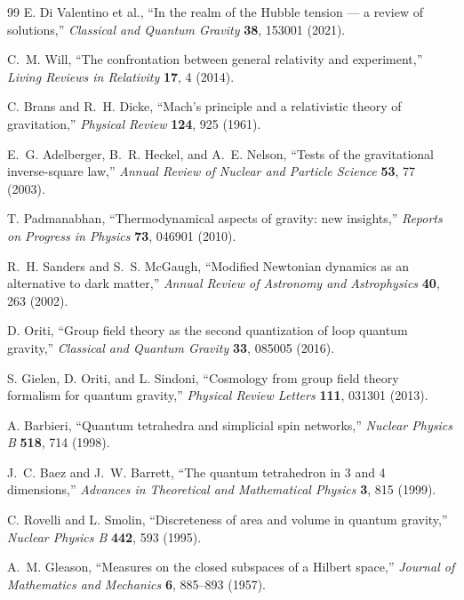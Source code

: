\documentclass[11pt]{article}
\begin{document}
\begin{thebibliography}{99}
E. Di Valentino et al.,
``In the realm of the Hubble tension --- a review of solutions,''
\emph{Classical and Quantum Gravity} \textbf{38}, 153001 (2021).

C.~M. Will,
``The confrontation between general relativity and experiment,''
\emph{Living Reviews in Relativity} \textbf{17}, 4 (2014).

C. Brans and R.~H. Dicke,
``Mach's principle and a relativistic theory of gravitation,''
\emph{Physical Review} \textbf{124}, 925 (1961).

E.~G. Adelberger, B.~R. Heckel, and A.~E. Nelson,
``Tests of the gravitational inverse-square law,''
\emph{Annual Review of Nuclear and Particle Science} \textbf{53}, 77 (2003).

T. Padmanabhan,
``Thermodynamical aspects of gravity: new insights,''
\emph{Reports on Progress in Physics} \textbf{73}, 046901 (2010).

R.~H. Sanders and S.~S. McGaugh,
``Modified Newtonian dynamics as an alternative to dark matter,''
\emph{Annual Review of Astronomy and Astrophysics} \textbf{40}, 263 (2002).

D. Oriti,
``Group field theory as the second quantization of loop quantum gravity,''
\emph{Classical and Quantum Gravity} \textbf{33}, 085005 (2016).

S. Gielen, D. Oriti, and L. Sindoni,
``Cosmology from group field theory formalism for quantum gravity,''
\emph{Physical Review Letters} \textbf{111}, 031301 (2013).

A. Barbieri,
``Quantum tetrahedra and simplicial spin networks,''
\emph{Nuclear Physics B} \textbf{518}, 714 (1998).

J.~C. Baez and J.~W. Barrett,
``The quantum tetrahedron in 3 and 4 dimensions,''
\emph{Advances in Theoretical and Mathematical Physics} \textbf{3}, 815 (1999).

C. Rovelli and L. Smolin,
``Discreteness of area and volume in quantum gravity,''
\emph{Nuclear Physics B} \textbf{442}, 593 (1995).

A.~M. Gleason,
``Measures on the closed subspaces of a Hilbert space,''
\emph{Journal of Mathematics and Mechanics} \textbf{6}, 885--893 (1957).


\end{thebibliography}
\end{document}
